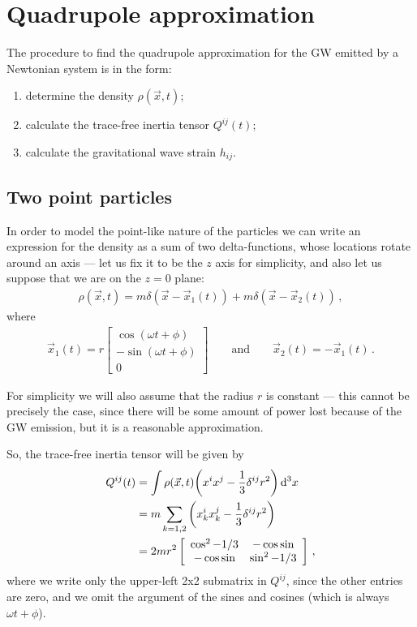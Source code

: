 \documentclass[main.tex]{subfiles}
\begin{document}
\section{Quadrupole approximation}

The procedure to find the quadrupole approximation 
for the GW emitted by a Newtonian system is in the form: 
\begin{enumerate}
    \item determine the density \(\rho (\vec{x}, t)\);
    \item calculate the trace-free inertia tensor \(Q^{ij}(t)\);
    \item calculate the gravitational wave strain \(h_{ij}\). 
\end{enumerate}

\subsection{Two point particles}

In order to model the point-like nature of the particles we can write an expression for the density as a sum of two delta-functions,
whose locations rotate around an axis --- let us fix it to be
the \(z\) axis for simplicity, 
and also let us suppose that we are on the \(z = 0 \) plane: 
%
\begin{align}
\rho (\vec{x}, t) = m\delta (\vec{x} - \vec{x}_1(t)) + m\delta (\vec{x} - \vec{x}_2 (t))
\,,
\end{align}
%
where 
%
\begin{align}
\vec{x}_1 (t) = r \left[\begin{array}{c}
\cos(\omega t + \phi ) \\ 
- \sin(\omega t + \phi ) \\ 
0
\end{array}\right]
\qquad \text{and} \qquad
\vec{x}_2 (t) = - \vec{x}_1 (t)
\,.
\end{align}

For simplicity we will also assume that the radius \(r\) is constant --- this cannot be precisely the case, since there will be some amount of power lost because of the GW emission, but it is a reasonable approximation.

So, the trace-free inertia tensor will be given by 
%
\begin{align}
Q^{ij} (t) &= \int \rho (\vec{x}, t) \qty( x^{i} x^{j} - \frac{1}{3} \delta^{ij} r^2) \dd[3]{x}  \\
&= m \sum _{k=1, 2} \qty(x_k^{i} x_k^{j} - \frac{1}{3} \delta^{ij} r^2)  \\
&= 2 m r^2 \left[\begin{array}{cc}
\cos^2 - 1/3 & - \cos \sin \\ 
- \cos \sin & \sin^2 - 1/3  
\end{array}\right] 
\,,
\end{align}
%
where we write only the upper-left 2x2 submatrix in \(Q^{ij}\), since the other entries are zero, and we omit the argument of the sines and cosines (which is always \(\omega t + \phi \)). 
\end{document}
